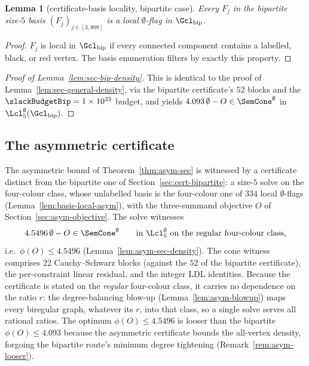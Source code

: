 \documentclass[11pt,a4paper]{article}
\newtheorem{lemma}[theorem]{Lemma}
\theoremstyle{definition}
\theoremstyle{remark}
\begin{document}
\begin{lemma}[certificate-basis locality, bipartite case]
\label{lem:basis-local-bip}
Every $F_j$ in the bipartite size-$5$ basis
$(F_j)_{j \in [3{,}808]}$ is a local $\emptyset$-flag in
$\Gcl_{\mathrm{bip}}$.
\end{lemma}

\begin{proof}
$F_j$ is local in $\Gcl_{\mathrm{bip}}$ if every connected component
contains a labelled, black, or red vertex. The basis enumeration
filters by exactly this property.
\end{proof}

\begin{proof}[Proof of Lemma~\ref{lem:sec-bip-density}]
This is identical to the proof of Lemma~\ref{lem:sec-general-density},
via the bipartite certificate's $52$ blocks and the
$\slackBudgetBip = 1 \times 10^{23}$ budget, and yields
$4.093\,\emptyset - O \in \SemCone^\emptyset$ in
$\Lcl^\emptyset_5(\Gcl_{\mathrm{bip}})$.
\end{proof}

\subsection{The asymmetric certificate}
\label{sec:cert-asym}

The asymmetric bound of Theorem~\ref{thm:asym-sec} is witnessed by a
certificate distinct from the bipartite one of
Section~\ref{sec:cert-bipartite}: a size-$5$ solve on the four-colour
class, whose unlabelled basis is the four-colour one of $334$ local
$\emptyset$-flags (Lemma~\ref{lem:basis-local-asym}), with the
three-summand objective $O$ of Section~\ref{sec:asym-objective}. The
solve witnesses
\[
4.5496\,\emptyset - O \in \SemCone^\emptyset
\qquad\text{in }\Lcl^\emptyset_5\text{ on the regular four-colour class,}
\]
i.e.\ $\phi(O) \leq 4.5496$ (Lemma~\ref{lem:asym-sec-density}). The
cone witness comprises $22$ Cauchy--Schwarz blocks (against the $52$
of the bipartite certificate), the per-constraint linear residual, and
the integer LDL identities. Because the certificate is
stated on the \emph{regular} four-colour class, it carries no
dependence on the ratio $r$: the degree-balancing blow-up
(Lemma~\ref{lem:asym-blowup}) maps every biregular graph, whatever its
$r$, into that class, so a single solve serves all rational ratios.
The optimum $\phi(O) \leq 4.5496$ is looser than the bipartite
$\phi(O) \leq 4.093$ because the asymmetric certificate bounds the
all-vertex density, forgoing the bipartite route's minimum degree
tightening (Remark~\ref{rem:asym-looser}).
\end{document}
